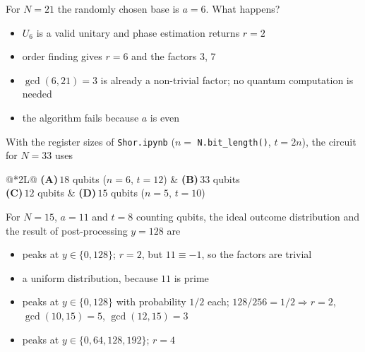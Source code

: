 \documentclass[11pt,a4paper]{article}
\newcommand{\optlabel}[1]{\textbf{(#1)}}
\newenvironment{qitem}[1]{\begin{list}{}{\setlength{\leftmargin}{3.3em}\setlength{\labelwidth}{3.1em}%
  \setlength{\labelsep}{0.2em}\setlength{\topsep}{3pt}\setlength{\parsep}{3pt}}\item[\textbf{Q.#1}\hfill]}{\end{list}}
\newcommand{\qsep}{\par\vspace{2pt}{\color{black!15}\hrule}\vspace{4pt}}
\begin{document}
\begin{qitem}{45}
For $N = 21$ the randomly chosen base is $a = 6$. What happens?
\begin{itemize}[leftmargin=2.6em, labelsep=0.4em, itemsep=2pt, topsep=3pt]
\item[\optlabel{A}] $U_6$ is a valid unitary and phase estimation returns $r = 2$
\item[\optlabel{B}] order finding gives $r = 6$ and the factors $3$, $7$
\item[\optlabel{C}] $\gcd(6, 21) = 3$ is already a non-trivial factor; no quantum computation is needed
\item[\optlabel{D}] the algorithm fails because $a$ is even
\end{itemize}
\end{qitem}
\qsep

\begin{qitem}{46}
With the register sizes of \texttt{Shor.ipynb} ($n = $ \texttt{N.bit\_length()}, $t = 2n$), the circuit for $N = 33$ uses
\par\smallskip\noindent\begin{tabularx}{\linewidth}{@{}*{2}{L}@{}}
\optlabel{A}\,$18$ qubits ($n = 6$, $t = 12$) & \optlabel{B}\,$33$ qubits \\[3pt]
\optlabel{C}\,$12$ qubits & \optlabel{D}\,$15$ qubits ($n = 5$, $t = 10$)
\end{tabularx}
\end{qitem}
\qsep

\begin{qitem}{47}
For $N = 15$, $a = 11$ and $t = 8$ counting qubits, the ideal outcome distribution and the result of post-processing $y = 128$ are
\begin{itemize}[leftmargin=2.6em, labelsep=0.4em, itemsep=2pt, topsep=3pt]
\item[\optlabel{A}] peaks at $y \in \{0, 128\}$; $r = 2$, but $11 \equiv -1$, so the factors are trivial
\item[\optlabel{B}] a uniform distribution, because $11$ is prime
\item[\optlabel{C}] peaks at $y \in \{0, 128\}$ with probability $1/2$ each; $128/256 = 1/2 \Rightarrow r = 2$, $\gcd(10, 15) = 5$, $\gcd(12, 15) = 3$
\item[\optlabel{D}] peaks at $y \in \{0, 64, 128, 192\}$; $r = 4$
\end{itemize}
\end{qitem}
\qsep
\end{document}
